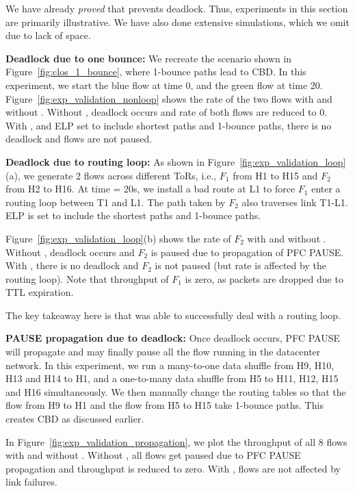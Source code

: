 We have already {\em proved} that \sysname{} prevents deadlock. Thus,
experiments in this section are primarily illustrative. We have also done
extensive simulations, which we omit due to lack of space.

\textbf{Deadlock due to one bounce:} We recreate the scenario shown in
Figure~\ref{fig:clos_1_bounce}, where 1-bounce paths lead to CBD.  In this
experiment, we start the blue flow at time 0, and the green flow at time 20.
Figure~\ref{fig:exp_validation_nonloop} shows the rate of the two flows with and
without \sysname{}.  Without \sysname{}, deadlock occurs and rate of both flows
are reduced to 0. With \sysname{}, and ELP set to include shortest paths and
1-bounce paths, there is no deadlock and flows are not paused.

\textbf{Deadlock due to routing loop:} As shown in
Figure~\ref{fig:exp_validation_loop}(a), we generate 2 flows across different
ToRs, i.e.,  $F_1$ from H1 to H15 and $F_2$ from H2 to H16. At time = 20s, we
install a bad route at L1 to force $F_1$ enter a routing loop between T1 and L1.
The path taken by $F_2$ also traverses link T1-L1.  ELP is set to include the
shortest paths and 1-bounce paths.

Figure~\ref{fig:exp_validation_loop}(b) shows the rate of $F_2$ with and
without \sysname{}. Without \sysname{}, deadlock occurs
and $F_2$ is paused due to propagation of PFC PAUSE. With \sysname{}, there is
no deadlock and $F_2$ is not paused (but rate is affected by the routing loop). Note that
throughput of $F_1$ is zero, as packets are dropped due to TTL expiration.

The key takeaway here is that \sysname{} was able to successfully deal with a
routing loop.

\textbf{PAUSE propagation due to deadlock:} Once deadlock occurs, PFC PAUSE will
propagate and may finally pause all the flow running in the datacenter network.
In this experiment, we run a many-to-one data shuffle from H9, H10, H13 and H14
to H1, and a one-to-many data shuffle from H5 to  H11, H12, H15 and H16
simultaneously. We then manually change the routing tables so that the flow from H9
to H1 and the flow from H5 to H15 take 1-bounce paths. This creates CBD as
discussed earlier.

In Figure~\ref{fig:exp_validation_propagation}, we plot the throughput of all 8
flows with and without \sysname{}. Without \sysname{}, all flows get paused due
to PFC PAUSE propagation and throughput is reduced to zero. With \sysname{},
flows are not affected by link failures.

